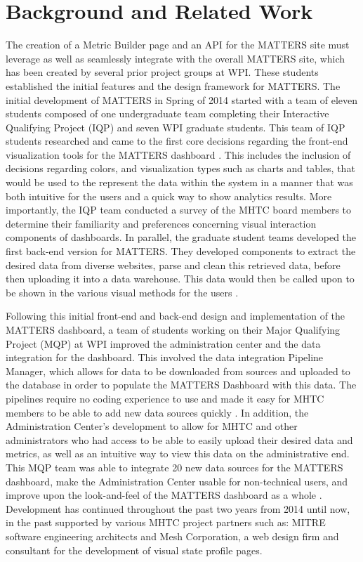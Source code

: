 \chapter{Background and Related Work}

	The creation of a Metric Builder page and an API for the MATTERS site must 
	leverage as well as seamlessly integrate with the overall MATTERS site, 
	which has been created by several prior project groups at WPI. These 
	students established the initial features and the design framework 
	for MATTERS. The initial development of MATTERS in Spring of 2014 
	started with a team of eleven students composed of one undergraduate team 
	completing their Interactive Qualifying Project (IQP) and seven WPI graduate 
	students. This team of IQP students researched and came to the first core 
	decisions regarding the front-end visualization tools for the MATTERS 
	dashboard \cite{prevreport}. This includes the inclusion of decisions 
	regarding colors, and visualization types such as charts and tables, that 
	would be used to the represent the data within the system in a manner that 
	was both intuitive for the users and a quick way to show analytics results. 
	More importantly, the IQP team conducted a survey of the MHTC board members 
	to determine their familiarity and preferences concerning visual interaction 
	components of dashboards. In parallel, the graduate student teams developed 
	the first back-end version for MATTERS. They developed components to extract 
	the desired data from diverse websites, parse and clean this retrieved data, 
	before then uploading it into a data warehouse. This data would then be 
	called upon to be shown in the various visual methods for the users 
	\cite{iqp}.

	Following this initial front-end and back-end design and implementation of 
	the MATTERS dashboard, a team of students working on their Major Qualifying 
	Project (MQP) at WPI improved the administration center and the data 
	integration for the dashboard. This involved the data integration Pipeline 
	Manager, which allows for data to be downloaded from sources and uploaded to 
	the database in order to populate the MATTERS Dashboard with this data. The 
	pipelines require no coding experience to use and made it easy for MHTC members 
	to be able to add new data sources quickly \cite{prevreport}. In addition, the 
	Administration Center's development to allow for 
	MHTC and other administrators who had access to be able to easily upload 
	their desired data and metrics, as well as an intuitive way to view this 
	data on the administrative end. This MQP team was able to integrate 20 new 
	data sources for the MATTERS dashboard, make the Administration Center 
	usable for non-technical users, and improve upon the look-and-feel of the 
	MATTERS dashboard as a whole \cite{iqp}. Development has continued throughout 
	the past two years from 2014 until now, in the past supported by various MHTC 
	project partners such as: MITRE software engineering architects and Mesh Corporation, 
	a web design firm and consultant for the development of visual state profile pages. 

